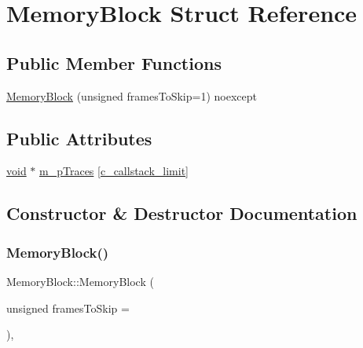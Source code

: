 \hypertarget{structMemoryBlock}{}\section{Memory\+Block Struct Reference}
\label{structMemoryBlock}
\subsection*{Public Member Functions}
\begin{DoxyCompactItemize}
\item 
\mbox{\hyperlink{structMemoryBlock_a1fbe0be57e368005db2f3cf5718b258e}{Memory\+Block}} (unsigned frames\+To\+Skip=1) noexcept
\end{DoxyCompactItemize}
\subsection*{Public Attributes}
\begin{DoxyCompactItemize}
\item 
\mbox{\hyperlink{mlasi_8h_a88f941d423cb2a819b70a1358982b1a6}{void}} $\ast$ \mbox{\hyperlink{structMemoryBlock_acded2b4a70f3a22a6822c382e2e95781}{m\+\_\+p\+Traces}} \mbox{[}\mbox{\hyperlink{debug__alloc_8cc_a1577d57cd8e28bfab7c0436ee2eb67c1}{c\+\_\+callstack\+\_\+limit}}\mbox{]}
\end{DoxyCompactItemize}


\subsection{Constructor \& Destructor Documentation}
\mbox{\label{structMemoryBlock_a1fbe0be57e368005db2f3cf5718b258e}} 
\subsubsection{\texorpdfstring{Memory\+Block()}{MemoryBlock()}}
{\footnotesize\ttfamily Memory\+Block\+::\+Memory\+Block (\begin{DoxyParamCaption}\item[{unsigned}]{frames\+To\+Skip = {} }\end{DoxyParamCaption})\hspace{0.3cm}{\ttfamily [inline]}, {\ttfamily [noexcept]}}



